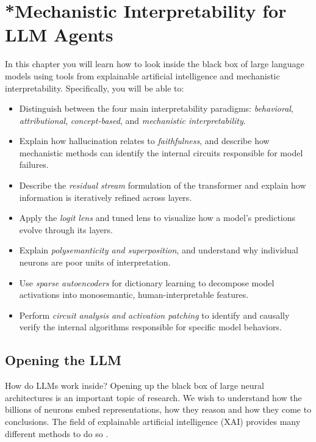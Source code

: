 
\chapter{*Mechanistic Interpretability for LLM Agents}\label{chap:mi}

\begin{learningbox}
In this chapter you will learn how to look inside the black box of 
large language models using tools from explainable artificial 
intelligence and mechanistic interpretability. Specifically, you 
will be able to:
\begin{itemize}[leftmargin=*, nosep]
    \item Distinguish between the four main interpretability paradigms: \textit{behavioral}, \textit{attributional}, \textit{concept-based}, and \textit{mechanistic interpretability}.
    \item Explain how hallucination relates to {\em faithfulness}, and  describe how mechanistic methods can identify the internal circuits responsible for model failures.
    \item Describe the {\em residual stream} formulation of the transformer and explain how information is iteratively refined across layers.
    \item Apply the {\em logit lens} and tuned lens to visualize how a   model's predictions evolve through its layers.
    \item Explain {\em polysemanticity and superposition}, and understand why individual neurons are poor units of interpretation.
    \item Use {\em sparse autoencoders} for dictionary learning to decompose model activations into monosemantic, human-interpretable features.
    \item Perform {\em circuit analysis and activation patching} to identify and causally verify the internal algorithms responsible for specific model behaviors.
\end{itemize}
\end{learningbox}

\section{Opening the LLM}
How do LLMs work  inside? Opening up the black box of large neural  architectures is an important topic of research. We wish to understand how the billions of neurons embed representations, how they reason and how they come to conclusions. The field of explainable artificial intelligence (XAI) provides many different methods to do so \citep{minh2022explainable,rios2020feature,van2022comparison,selvaraju2017grad,ali2022xai}.

